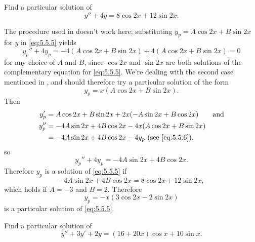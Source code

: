 \begin{example}\label{example:5.5.2}
Find a particular solution of
\begin{equation} \label{eq:5.5.5}
y''+4y=8\cos2x+12\sin2x.
\end{equation}
\end{example}

\begin{solution}
The procedure used in   doesn't work here;
substituting $y_p=A\cos2x+B\sin2x$ for $y$ in \eqref{eq:5.5.5} yields
\[
y_p''+4y_p=-4(A\cos2x+B\sin2x) +4(A\cos2x+B\sin2x)=0
\]
for any choice of $A$ and $B$, since $\cos2x$ and $\sin2x$ are both
solutions of the complementary equation for \eqref{eq:5.5.5}. We're
dealing with the second case mentioned in , and
should therefore try a particular solution of the form
\begin{equation} \label{eq:5.5.6}
y_p=x(A\cos2x+B\sin2x).
\end{equation}
Then
\begin{align*}
y_p'&=A\cos2x+B\sin2x+2x(-A\sin2x+B\cos2x)\qquad\text{and}\\
y_p''&=-4A\sin2x+4B\cos2x-4x(A\cos2x+B\sin2x)\\
&=-4A\sin2x+4B\cos2x-4y_p \text{ (see \eqref{eq:5.5.6})},
\end{align*}
so
\[
y_p''+4y_p=-4A\sin2x+4B\cos2x.
\]
Therefore $y_p$ is a solution of \eqref{eq:5.5.5} if
\[
-4A\sin2x+4B\cos2x=8\cos2x+12\sin2x,
\]
which holds if $A=-3$ and $B=2$.  Therefore
\[
y_p=-x(3\cos2x-2\sin2x)
\]
is a particular solution of \eqref{eq:5.5.5}.
\end{solution}

\begin{example}\label{example:5.5.3}
Find a particular solution of
\begin{equation} \label{eq:5.5.7}
y''+3y'+2y=(16+20x)\cos x+10\sin x.
\end{equation}
\end{example}

